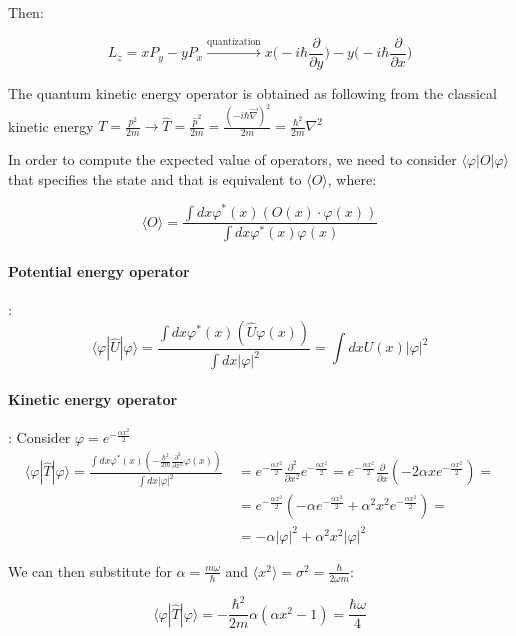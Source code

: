     Then:

    $$L_z = xP_y - yP_x\xrightarrow[]{\text{quantization}}x\biggl(-i\hbar\frac{\partial}{\partial y}\biggr) - y\biggl(-i\hbar\frac{\partial}{\partial x}\biggr)$$

    The quantum kinetic energy operator is obtained as following from the classical kinetic energy  $T=\frac{p^2}{2m} \rightarrow \hat{T}=\frac{\hat{p}^2}{2m}=\frac{(-i\hbar\vec{\nabla})^2}{2m}=\frac{\hbar^2}{2m}\nabla^2$

    In order to compute the expected value of operators, we need to consider $\langle \varphi|O|\varphi\rangle$ that specifies the state and that is equivalent to $\langle O\rangle$, where:

    $$\langle O\rangle = \frac{\int dx \varphi^*(x)(O(x)\cdot\varphi(x))}{\int dx\varphi^*(x)\varphi(x)}$$

      \paragraph{Potential energy operator}:
      $$\langle\varphi|\hat{U}|\varphi\rangle =\frac{\int dx\varphi^*(x)(\hat{U}\varphi(x))}{\int dx |\varphi|^2}= \int d x U(x) |\varphi|^2$$

	    \paragraph{Kinetic energy operator}:
	    Consider $\varphi=e^{-\frac{\alpha x^2}{2}}$
      \begin{align*}
        \langle\varphi|\hat{T}|\varphi\rangle =\frac{\int dx\varphi^*(x)(-\frac{\hbar^2}{2m}\frac{\partial^2}{\partial x^2}\varphi(x))}{\int dx |\varphi|^2}\
                                        &=e^{-\frac{\alpha x^2}{2}}\frac{\partial^2}{\partial x^2}e^{-\frac{\alpha x^2}{2}} = e^{-\frac{\alpha x^2}{2}}\frac{\partial}{\partial x}(-2\alpha xe^{-\frac{\alpha x^2}{2}}) =\\
                                        &=e^{-\frac{\alpha x^2}{2}}(-\alpha e^{-\frac{\alpha x^2}{2}}+\alpha^2 x^2e^{-\frac{\alpha x^2}{2}})= \\
                                        &=-\alpha|\varphi|^2 + \alpha^2 x^2|\varphi|^2
      \end{align*}


      We can then substitute for $\alpha=\frac{m\omega}{\hbar}$ and $\langle{x^2}\rangle=\sigma^2=\frac{\hbar}{2\omega m}$:

      $$\langle\varphi|\hat{T}|\varphi\rangle = -\frac{\hbar^2}{2m} \alpha(\alpha x^2-1)=\frac{\hbar\omega}{4}$$


